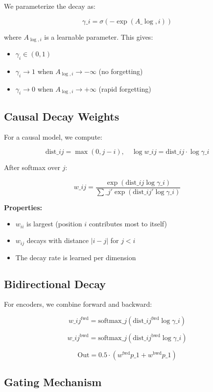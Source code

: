 We parameterize the decay as:

\[
\gamma\_i = \sigma(-\exp(A\_{\log, i}))
\tag{3.7}
\]

where $A_{\log, i}$ is a learnable parameter. This gives:

\begin{itemize}
\item $\gamma_i \in (0, 1)$
\item $\gamma_i \to 1$ when $A_{\log, i} \to -\infty$ (no forgetting)
\item $\gamma_i \to 0$ when $A_{\log, i} \to +\infty$ (rapid forgetting)

\end{itemize}
\subsection{Causal Decay Weights}

For a causal model, we compute:

\[
\text{dist}\_{ij} = \max(0, j - i), \quad
\log w\_{ij} = \text{dist}\_{ij} \cdot \log \gamma\_i
\tag{3.8}
\]

After softmax over $j$:

\[
w\_{ij} = \frac{\exp(\text{dist}\_{ij} \log \gamma\_i)}{\sum\_{j'} \exp(\text{dist}\_{ij'} \log \gamma\_i)}
\tag{3.9}
\]

\textbf{Properties:}
\begin{itemize}
\item $w_{ii}$ is largest (position $i$ contributes most to itself)
\item $w_{ij}$ decays with distance $|i - j|$ for $j < i$
\item The decay rate is learned per dimension

\end{itemize}
\subsection{Bidirectional Decay}

For encoders, we combine forward and backward:

\[
w\_{ij}^\text{fwd} = \text{softmax}\_j(\text{dist}\_{ij}^\text{fwd} \log \gamma\_i)
\tag{3.10}
\]

\[
w\_{ij}^\text{bwd} = \text{softmax}\_j(\text{dist}\_{ij}^\text{bwd} \log \gamma\_i)
\tag{3.11}
\]

\[
\text{Out} = 0.5 \cdot (w^\text{fwd} p\_1 + w^\text{bwd} p\_1)
\tag{3.12}
\]

\subsection{Gating Mechanism}

